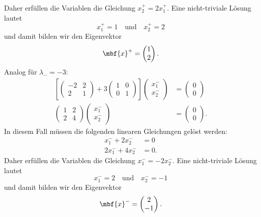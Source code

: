 \begin{lösung}
  Daher erfüllen die Variablen die Gleichung $x_2^+ = 2x_1^+$. Eine nicht-triviale Lösung lautet
  \begin{equation}
    x_1^+ = 1 \quad \text{und} \quad x_2^+ = 2
  \end{equation}
  und damit bilden wir den Eigenvektor
  \begin{equation}
    \mbf{x}^+ = \begin{pmatrix}
      1 \\ 2
    \end{pmatrix}.
  \end{equation}
  Analog für $\lambda_- = -3$:
  \begin{equation}
    \begin{split}
      \left[\begin{pmatrix}
      -2 & 2 \\ 2 & 1
    \end{pmatrix}+3\begin{pmatrix}
      1 & 0 \\ 0 & 1
    \end{pmatrix}\right] \begin{pmatrix}
      x_1^- \\ 
      x_2^-
    \end{pmatrix} &= \begin{pmatrix}
    0\\ 0
    \end{pmatrix} \\
    \begin{pmatrix}
      1 & 2 \\ 2 & 4
    \end{pmatrix}\begin{pmatrix}
      x_1^- \\ 
      x_2^-
    \end{pmatrix} &= \begin{pmatrix}
    0\\ 0
    \end{pmatrix}.
    \end{split}
  \end{equation}
  In diesem Fall müssen die folgenden linearen Gleichungen gelöst werden:
  \begin{equation}
    \begin{split}
      x_1^- +2x_2^- &= 0 \\
      2x_1^- + 4x_2^- &= 0.
    \end{split}
  \end{equation}
  Daher erfüllen die Variablen die Gleichung $x_1^- = -2x_2^-$. Eine nicht-triviale Lösung lautet
  \begin{equation}
    x_1^- = 2 \quad \text{und} \quad x_2^- = -1
  \end{equation}
  und damit bilden wir den Eigenvektor
  \begin{equation}
    \mbf{x}^- = \begin{pmatrix}
      2 \\ -1
    \end{pmatrix}.
  \end{equation}
\end{lösung}

